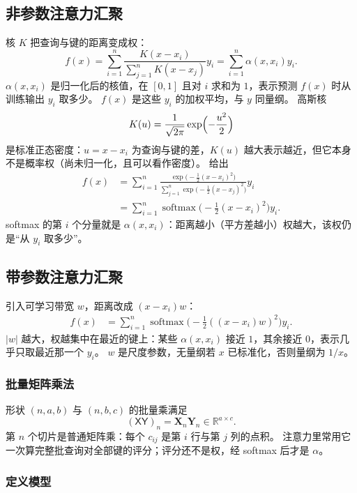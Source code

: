 \subsection{非参数注意力汇聚}

核 $K$ 把查询与键的距离变成权：
\[
f(x)=\sum_{i=1}^{n}\frac{K(x-x_i)}{\sum_{j=1}^{n}K(x-x_j)}y_i
=
\sum_{i=1}^{n}\alpha(x,x_i)y_i.
\]
$\alpha(x,x_i)$ 是归一化后的核值，在 $[0,1]$ 且对 $i$ 求和为 $1$，表示预测 $f(x)$ 时从训练输出 $y_i$ 取多少。
$f(x)$ 是这些 $y_i$ 的加权平均，与 $y$ 同量纲。
高斯核
\[
K(u)=\frac{1}{\sqrt{2\pi}}\exp\Bigl(-\frac{u^{2}}{2}\Bigr)
\]
是标准正态密度：$u=x-x_i$ 为查询与键的差，$K(u)$ 越大表示越近，但它本身不是概率权（尚未归一化，且可以看作密度）。
给出
\begin{align*}
f(x)
&=
\sum_{i=1}^{n}
\frac{\exp\bigl(-\tfrac{1}{2}(x-x_i)^{2}\bigr)}
{\sum_{j=1}^{n}\exp\bigl(-\tfrac{1}{2}(x-x_j)^{2}\bigr)}
y_i
\\
&=
\sum_{i=1}^{n}
\operatorname{softmax}\bigl(-\tfrac{1}{2}(x-x_i)^{2}\bigr)y_i.
\end{align*}
softmax 的第 $i$ 个分量就是 $\alpha(x,x_i)$：距离越小（平方差越小）权越大，该权仍是“从 $y_i$ 取多少”。

\subsection{带参数注意力汇聚}

引入可学习带宽 $w$，距离改成 $(x-x_i)w$：
\begin{align*}
f(x)
&=
\sum_{i=1}^{n}
\operatorname{softmax}\bigl(-\tfrac{1}{2}((x-x_i)w)^{2}\bigr)y_i.
\end{align*}
$|w|$ 越大，权越集中在最近的键上：某些 $\alpha(x,x_i)$ 接近 $1$，其余接近 $0$，表示几乎只取最近那一个 $y_i$。
$w$ 是尺度参数，无量纲若 $x$ 已标准化，否则量纲为 $1/x$。

\subsubsection{批量矩阵乘法}

形状 $(n,a,b)$ 与 $(n,b,c)$ 的批量乘满足
\[
(\mathsf{X}\mathsf{Y})_{n}=\bm{X}_{n}\bm{Y}_{n}\in\mathbb{R}^{a\times c}.
\]
第 $n$ 个切片是普通矩阵乘：每个 $c_{ij}$ 是第 $i$ 行与第 $j$ 列的点积。
注意力里常用它一次算完整批查询对全部键的评分；评分还不是权，经 softmax 后才是 $\alpha$。

\subsubsection{定义模型}

